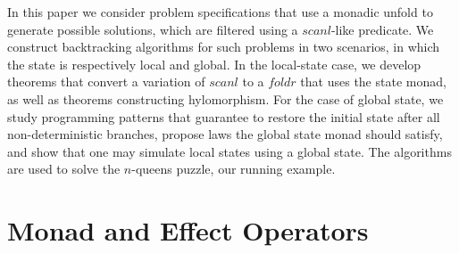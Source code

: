 \documentclass{llncs}
\newcommand{\Varid}[1]{\mathit{#1}}
\let\Varid\mathit
\begin{document}
In this paper we consider problem specifications that use a monadic unfold to generate possible solutions, which are filtered using a \ensuremath{\Varid{scanl}}-like predicate.
We construct backtracking algorithms for such problems in two scenarios, in which the state is respectively local and global.
In the local-state case, we develop theorems that convert a variation of \ensuremath{\Varid{scanl}} to a \ensuremath{\Varid{foldr}} that uses the state monad, as well as theorems constructing hylomorphism.
For the case of global state, we study programming patterns that guarantee to restore the initial state after all non-deterministic branches, propose laws the global state monad should satisfy, and show that one may simulate local states using a global state.
The algorithms are used to solve the \ensuremath{\Varid{n}}-queens puzzle, our running example.
\section{Monad and Effect Operators}
\end{document}
